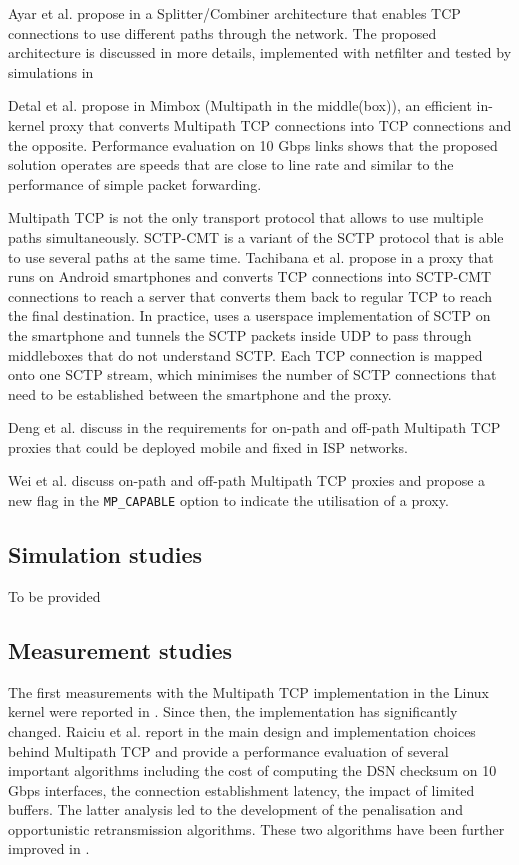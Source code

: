 Ayar et al. propose in \cite{draft-ayar-transparent-sca-proxy-00} a Splitter/Combiner architecture that enables TCP connections to use different paths
through the network. The proposed architecture is discussed in more details, implemented with netfilter and tested by simulations in \cite{Ayar_SCA:2012,Ayar_TCP:2012}

Detal et al. propose in \cite{Detal_Mimbox:2013} Mimbox (Multipath in the middle(box)), an efficient in-kernel proxy that converts Multipath TCP connections into TCP connections and the opposite. Performance evaluation on 10 Gbps links shows that
the proposed solution operates are speeds that are close to line rate and similar to the performance of simple packet forwarding.

Multipath TCP is not the only transport protocol that allows to use multiple paths simultaneously. SCTP-CMT is a variant of the SCTP protocol that is able to use several paths at the same time. Tachibana et al. propose in \cite{Tachibana_proxy:2014} a 
proxy that runs on Android smartphones and converts TCP connections into SCTP-CMT connections to reach a server that
converts them back to regular TCP to reach the final destination.
In practice, \cite{Tachibana_proxy:2014} uses a userspace implementation of SCTP on the smartphone and tunnels the SCTP packets inside UDP to pass through middleboxes that do not 
understand SCTP. Each TCP connection is mapped onto one SCTP stream, which minimises the number of SCTP connections that need to be established between the smartphone and the proxy.

Deng et al. discuss in \cite{draft-deng-mptcp-proxy} the requirements for on-path and off-path Multipath TCP proxies that could be deployed mobile and fixed in ISP networks. 

Wei et al. \cite{draft-wei-mptcp-proxy-mechanism} discuss on-path and off-path Multipath TCP proxies and propose a new flag in the \texttt{MP\_CAPABLE} option to indicate the utilisation of a proxy.

\subsection{Simulation studies}

To be provided

\subsection{Measurement studies}


The first measurements with the Multipath TCP implementation in the Linux kernel were reported in \cite{Barre_Multipath:2011}. Since then, the implementation has significantly changed. Raiciu et al. report in \cite{Raiciu_Hard:2012} the main design and implementation choices behind Multipath TCP and provide a performance evaluation of several important algorithms including the cost of computing the DSN checksum on 10 Gbps interfaces, the connection establishment latency, the impact of limited buffers. The latter analysis led to the development of the penalisation and opportunistic retransmission algorithms. These two algorithms have been further improved in \cite{Paasch_Experimental:2013}.



